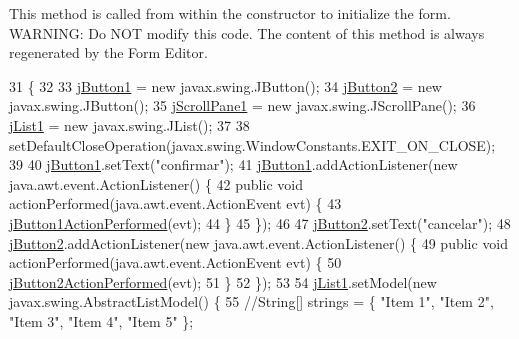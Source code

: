 This method is called from within the constructor to initialize the form. W\+A\+R\+N\+I\+NG\+: Do N\+OT modify this code. The content of this method is always regenerated by the Form Editor. 
\begin{DoxyCode}
31                                   \{
32 
33         \mbox{\hyperlink{class_interfaz_package_1_1facturas_adb32118a114d1f85a76fafb76589f8c6}{jButton1}} = \textcolor{keyword}{new} javax.swing.JButton();
34         \mbox{\hyperlink{class_interfaz_package_1_1facturas_acf837914fb3ffc261c9cdb1174c6d9bc}{jButton2}} = \textcolor{keyword}{new} javax.swing.JButton();
35         \mbox{\hyperlink{class_interfaz_package_1_1facturas_aaf7b2113c167e17f0be9bea690595685}{jScrollPane1}} = \textcolor{keyword}{new} javax.swing.JScrollPane();
36         \mbox{\hyperlink{class_interfaz_package_1_1facturas_adbdef786d8dff4c1b59ff2a1308ed6c5}{jList1}} = \textcolor{keyword}{new} javax.swing.JList();
37 
38         setDefaultCloseOperation(javax.swing.WindowConstants.EXIT\_ON\_CLOSE);
39 
40         \mbox{\hyperlink{class_interfaz_package_1_1facturas_adb32118a114d1f85a76fafb76589f8c6}{jButton1}}.setText(\textcolor{stringliteral}{"confirmar"});
41         \mbox{\hyperlink{class_interfaz_package_1_1facturas_adb32118a114d1f85a76fafb76589f8c6}{jButton1}}.addActionListener(\textcolor{keyword}{new} java.awt.event.ActionListener() \{
42             \textcolor{keyword}{public} \textcolor{keywordtype}{void} actionPerformed(java.awt.event.ActionEvent evt) \{
43                 \mbox{\hyperlink{class_interfaz_package_1_1facturas_a46e4e792f309129dc699c57b1cc16d64}{jButton1ActionPerformed}}(evt);
44             \}
45         \});
46 
47         \mbox{\hyperlink{class_interfaz_package_1_1facturas_acf837914fb3ffc261c9cdb1174c6d9bc}{jButton2}}.setText(\textcolor{stringliteral}{"cancelar"});
48         \mbox{\hyperlink{class_interfaz_package_1_1facturas_acf837914fb3ffc261c9cdb1174c6d9bc}{jButton2}}.addActionListener(\textcolor{keyword}{new} java.awt.event.ActionListener() \{
49             \textcolor{keyword}{public} \textcolor{keywordtype}{void} actionPerformed(java.awt.event.ActionEvent evt) \{
50                 \mbox{\hyperlink{class_interfaz_package_1_1facturas_a023cec016c322f3d44297ce73f0e70e6}{jButton2ActionPerformed}}(evt);
51             \}
52         \});
53 
54         \mbox{\hyperlink{class_interfaz_package_1_1facturas_adbdef786d8dff4c1b59ff2a1308ed6c5}{jList1}}.setModel(\textcolor{keyword}{new} javax.swing.AbstractListModel() \{
55             \textcolor{comment}{//String[] strings = \{ "Item 1", "Item 2", "Item 3", "Item 4", "Item 5" \};}

\end{DoxyCode}
